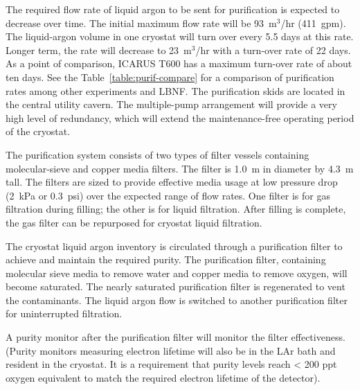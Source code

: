The required flow rate of liquid argon to be sent for purification 
is expected to decrease over time. The initial maximum flow rate 
will be 93~m$^3$/hr (411~gpm). The liquid-argon volume in one 
cryostat will turn over every 5.5 days at this rate. 
Longer term, the rate will decrease to 23~m$^3$/hr 
with a turn-over rate of 22 days.  As a point of comparison, ICARUS 
T600 has a maximum turn-over rate of about ten days. See the 
Table~\ref{table:purif-compare} for a comparison of purification 
rates among other experiments and LBNF. 
The purification skids are located in the central utility cavern.  
The multiple-pump arrangement will provide a very 
high level of redundancy, which will extend the maintenance-free 
operating period of the cryostat.  


The purification system consists of two types of filter vessels containing
 molecular-sieve and copper media filters. The filter is 1.0~m in 
diameter by 4.3~m tall. The filters are sized to provide effective 
media usage at low pressure drop (2~kPa or 0.3~psi) over the 
expected range of flow rates. One filter is for gas filtration 
during filling; the other is for liquid filtration. After filling 
is complete, the gas filter can be repurposed for cryostat 
liquid filtration.

The cryostat liquid argon inventory is circulated through a purification 
filter to achieve and maintain the required purity. The purification filter,
 containing molecular sieve media to remove water and copper media to 
remove oxygen, will become saturated. The nearly saturated purification 
filter is regenerated to vent the contaminants. The liquid argon flow 
is switched to another purification filter for uninterrupted filtration. 

A purity monitor after the purification filter will monitor the filter 
effectiveness. (Purity monitors measuring electron lifetime will also 
be in the LAr bath and resident in the cryostat. It is a requirement 
that purity levels reach < 200 ppt oxygen equivalent to match the 
required electron lifetime of the detector). 

